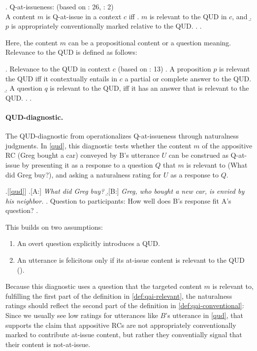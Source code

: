 \documentclass[12pt]{article}
\begin{document}
    \ex. \label{def:qai}%
      Q-at-issueness: \hfill (based on \citealt{simons_what_2010}: 26, \citealt{koev_notions_2018}: 2)\\
      A content $m$ is Q-at-issue in a context $c$ iff
      \a. \label{def:qai-relevant}%
        $m$ is relevant to the QUD in $c$, and
      \b.  \label{def:qai-conventional}%
        $p$ is appropriately conventionally marked relative to the QUD.
      \z. 
    \z.

    Here, the content $m$ can be a propositional content or a question meaning. Relevance to the QUD is defined as follows:

    \ex. Relevance to the QUD in context $c$ \hfill (based on \citealt{simons_what_2010}: 13)
      \a. A proposition $p$ is relevant the QUD iff it contextually entails in $c$ a partial or complete answer to the QUD.
      \b. A question $q$ is relevant to the QUD, iff it has an answer that is relevant to the QUD.
      \z.
    \z.

    \paragraph{QUD-diagnostic.}
      The QUD-diagnostic from \citealt{tonhauser_diagnosing_2012} operationalizes Q-at-issueness through naturalness judgments. In \ref{qud}, this diagnostic tests whether the content $m$ of the appositive RC (Greg bought a car) conveyed by B's utterance $U$ can be construed as Q-at-issue by presenting it as a response to a question $Q$ that $m$ is relevant to (What did Greg buy?), and asking a naturalness rating for $U$ as a response to $Q$.

      \ex.[\ref{qud}]
        \a.[A:] \emph{What did Greg buy?}
        \b.[B:] \emph{Greg, who bought a new car, is envied by his neighbor.}
        \z.
        Question to participants: How well does B's response fit A's question?
      \z.

      This builds on two assumptions:
      \begin{enumerate}
        \item An overt question explicitly introduces a QUD.
        \item An utterance is felicitous only if its at-issue content is relevant to the QUD (\citealt{amaral_review_2007,tonhauser_diagnosing_2012}).
      \end{enumerate}

      Because this diagnostic uses a question that the targeted content $m$ is relevant to, fulfilling the first part of the definition in \ref{def:qai-relevant}, the naturalness ratings should reflect the second part of the definition in \ref{def:qai-conventional}: Since we usually see low ratings for utterances like $B$'s utterance in \ref{qud}, that supports the claim that appositive RCs are not appropriately conventionally marked to contribute at-issue content, but rather they conventially signal that their content is not-at-issue.
    
\end{document}
